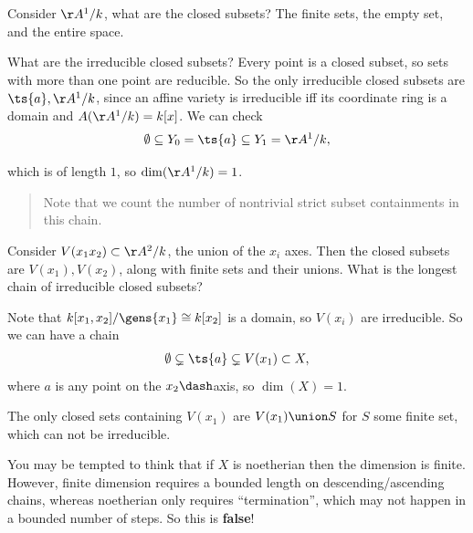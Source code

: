 \begin{example}

Consider \(\AA^1/k\), what are the closed subsets? The finite sets, the
empty set, and the entire space.

What are the irreducible closed subsets? Every point is a closed subset,
so sets with more than one point are reducible. So the only irreducible
closed subsets are \(\ts{a}, \AA^1/k\), since an affine variety is
irreducible iff its coordinate ring is a domain and
\(A(\AA^1/k) = k[x]\). We can check
\begin{align*}  
\emptyset \subseteq Y_0 = \ts{a} \subseteq Y_1 = \AA^1/k
,\end{align*}

which is of length \(1\), so \(\dim(\AA^1/k) = 1\).

\begin{quote}
Note that we count the number of nontrivial strict subset containments
in this chain.
\end{quote}

\end{example}

\begin{example}

Consider \(V(x_1 x_2) \subset \AA^2/k\), the union of the \(x_i\) axes.
Then the closed subsets are \(V(x_1), V(x_2)\), along with finite sets
and their unions. What is the longest chain of irreducible closed
subsets?

Note that \(k[x_1, x_2] / \gens{x_1} \cong k[x_2]\) is a domain, so
\(V(x_i)\) are irreducible. So we can have a chain
\begin{align*}  
\emptyset \subsetneq \ts{a} \subsetneq V(x_1) \subset X
,\end{align*} where \(a\) is any point on the \(x_2\dash\)axis, so
\(\dim(X) = 1\).

The only closed sets containing \(V(x_1)\) are \(V(x_1)\union S\) for
\(S\) some finite set, which can not be irreducible.

\end{example}

\begin{remark}

You may be tempted to think that if \(X\) is noetherian then the
dimension is finite. However, finite dimension requires a bounded length
on descending/ascending chains, whereas noetherian only requires
``termination'', which may not happen in a bounded number of steps. So
this is \textbf{false}!

\end{remark}

